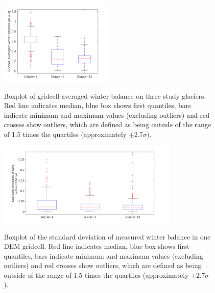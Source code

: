 \documentclass[onecolumn, letterpaper]{igs}
\newcommand{\boxMatlab}{Red line indicates median, blue box shows first quantiles, bars indicate minimum and maximum values (excluding outliers) and red crosses show outliers, which are defined as being outside of the range of 1.5 times the quartiles (approximately $\pm2.7\sigma$). }
\renewcommand{\thefigure}{S\arabic{figure}}
\begin{document}
\renewcommand{\thefigure}{S\arabic{figure}}
\addtocounter{figure}{+1}

\begin{figure}[H]
\centering
	\includegraphics[width =0.5\textwidth]{GridcellWB_boxplot.png}\\
	\caption{Boxplot of gridcell-averaged winter balance on three study glaciers. \boxMatlab}
	\label{fig:GridcellWB_boxplot}
\end{figure}

\begin{figure}[H]
\centering
	\includegraphics[width = 0.8\textwidth]{DEMcellSTD.png}\\
	\caption[]{Boxplot of the standard deviation of measured winter balance in one DEM gridcell. \boxMatlab}
	\label{fig:DEMcellSTD}
\end{figure}
\end{document}

